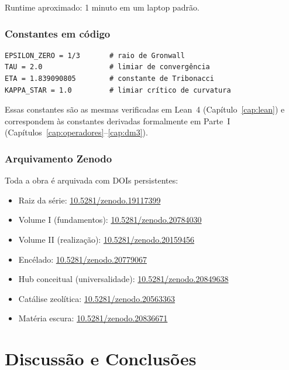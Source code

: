 \documentclass[12pt,a4paper,twoside]{book}
\theoremstyle{plain}
\theoremstyle{definition}
\theoremstyle{definition}
\begin{document}
Runtime aproximado: 1 minuto em um laptop padrão.

\section{Constantes em código}

\begin{verbatim}
EPSILON_ZERO = 1/3       # raio de Gronwall
TAU = 2.0                # limiar de convergência
ETA = 1.839090805        # constante de Tribonacci
KAPPA_STAR = 1.0         # limiar crítico de curvatura
\end{verbatim}

Essas constantes são as mesmas verificadas em Lean~4 (Capítulo~\ref{cap:lean})
e correspondem às constantes derivadas formalmente em
Parte~I (Capítulos~\ref{cap:operadores}--\ref{cap:dm3}).

\section{Arquivamento Zenodo}

Toda a obra é arquivada com DOIs persistentes:
\begin{itemize}
  \item Raiz da série: \href{https://doi.org/10.5281/zenodo.19117399}{10.5281/zenodo.19117399}
  \item Volume I (fundamentos): \href{https://doi.org/10.5281/zenodo.20784030}{10.5281/zenodo.20784030}
  \item Volume II (realização): \href{https://doi.org/10.5281/zenodo.20159456}{10.5281/zenodo.20159456}
  \item Encélado: \href{https://doi.org/10.5281/zenodo.20779067}{10.5281/zenodo.20779067}
  \item Hub conceitual (universalidade): \href{https://doi.org/10.5281/zenodo.20849638}{10.5281/zenodo.20849638}
  \item Catálise zeolítica: \href{https://doi.org/10.5281/zenodo.20563363}{10.5281/zenodo.20563363}
  \item Matéria escura: \href{https://doi.org/10.5281/zenodo.20836671}{10.5281/zenodo.20836671}
\end{itemize}

\part{Discussão e Conclusões}
\end{document}
